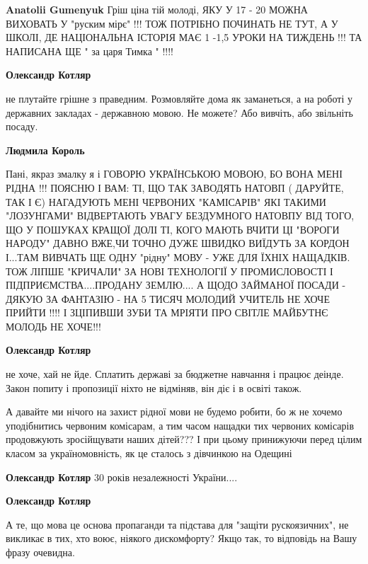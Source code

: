 \begin{itemize}
\begin{itemize}
\begin{itemize} %
\textbf{Anatolii Gumenyuk} Гріш ціна тій молоді, ЯКУ У 17 - 20 МОЖНА ВИХОВАТЬ У "руским мірє" !!! ТОЖ ПОТРІБНО ПОЧИНАТЬ НЕ ТУТ, А У ШКОЛІ, ДЕ НАЦІОНАЛЬНА ІСТОРІЯ МАЄ 1 -1,5 УРОКИ НА ТИЖДЕНЬ !!! ТА НАПИСАНА ЩЕ " за царя Тимка " !!!!
\end{itemize} %

\textbf{Олександр Котляр}

не плутайте грішне з праведним. Розмовляйте дома як заманеться, а на роботі у
державних закладах - державною мовою. Не можете? Або вивчіть, або звільніть
посаду.

\begin{itemize} %
\textbf{Людмила Король} 

Пані, якраз змалку я і ГОВОРЮ УКРАЇНСЬКОЮ МОВОЮ, БО ВОНА МЕНІ РІДНА !!! ПОЯСНЮ
І ВАМ: ТІ, ЩО ТАК ЗАВОДЯТЬ НАТОВП ( ДАРУЙТЕ, ТАК І Є) НАГАДУЮТЬ МЕНІ ЧЕРВОНИХ
"КАМІСАРІВ" ЯКІ ТАКИМИ "ЛОЗУНГАМИ" ВІДВЕРТАЮТЬ УВАГУ БЕЗДУМНОГО НАТОВПУ ВІД
ТОГО, ЩО У ПОШУКАХ КРАЩОЇ ДОЛІ ТІ, КОГО МАЮТЬ ВЧИТИ ЦІ "ВОРОГИ НАРОДУ" ДАВНО
ВЖЕ,ЧИ ТОЧНО ДУЖЕ ШВИДКО ВИЇДУТЬ ЗА КОРДОН І...ТАМ ВИВЧАТЬ ЩЕ ОДНУ "рідну" МОВУ
- УЖЕ ДЛЯ ЇХНІХ НАЩАДКІВ. ТОЖ ЛІПШЕ "КРИЧАЛИ" ЗА НОВІ ТЕХНОЛОГІЇ У
ПРОМИСЛОВОСТІ І ПІДПРИЄМСТВА....ПРОДАНУ ЗЕМЛЮ.... А ЩОДО ЗАЙМАНОЇ ПОСАДИ -
ДЯКУЮ ЗА ФАНТАЗІЮ - НА 5 ТИСЯЧ МОЛОДИЙ УЧИТЕЛЬ НЕ ХОЧЕ ПРИЙТИ !!!! І ЗЦІПИВШИ
ЗУБИ ТА МРІЯТИ ПРО СВІТЛЕ МАЙБУТНЄ МОЛОДЬ НЕ ХОЧЕ!!!


\textbf{Олександр Котляр} 

не хоче, хай не йде. Сплатить державі за бюджетне навчання і працює деінде.
Закон попиту і пропозиції ніхто не відміняв, він діє і в освіті також.

\end{itemize} %


А давайте ми нічого на захист рідної мови не будемо робити, бо ж не хочемо
уподібнитись червоним комісарам, а тим часом нащадки тих червоних комісарів
продовжують зросійщувати наших дітей??? І при цьому принижуючи перед цілим
класом за україномовність, як це сталось з дівчинкою на Одещині


\textbf{Олександр Котляр} 30 років незалежності України....

\textbf{Олександр Котляр}

А те, що мова це основа пропаганди та підстава для "защіти рускоязичних", не
викликає в тих, хто воює, ніякого дискомфорту?  Якщо так, то відповідь на Вашу
фразу очевидна.


\end{itemize}
\end{itemize}
